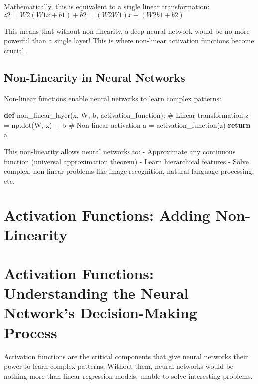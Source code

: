 \documentclass[
  letterpaper,
  DIV=11,
  numbers=noendperiod]{scrreprt}
\newenvironment{Shaded}{\begin{snugshade}}{\end{snugshade}}
\newcommand{\CommentTok}[1]{\textcolor[rgb]{0.37,0.37,0.37}{#1}}
\newcommand{\ControlFlowTok}[1]{\textcolor[rgb]{0.00,0.23,0.31}{\textbf{#1}}}
\newcommand{\KeywordTok}[1]{\textcolor[rgb]{0.00,0.23,0.31}{\textbf{#1}}}
\newcommand{\NormalTok}[1]{\textcolor[rgb]{0.00,0.23,0.31}{#1}}
\newcommand{\OperatorTok}[1]{\textcolor[rgb]{0.37,0.37,0.37}{#1}}
\begin{document}
Mathematically, this is equivalent to a single linear transformation:
\(z2 = W2(W1x + b1) + b2 = (W2W1)x + (W2b1 + b2)\)

This means that without non-linearity, a deep neural network would be no
more powerful than a single layer! This is where non-linear activation
functions become crucial.

\subsection{Non-Linearity in Neural
Networks}\label{non-linearity-in-neural-networks}

Non-linear functions enable neural networks to learn complex patterns:

\begin{Shaded}
\begin{Highlighting}[]
\KeywordTok{def}\NormalTok{ non\_linear\_layer(x, W, b, activation\_function):}
    \CommentTok{\# Linear transformation}
\NormalTok{    z }\OperatorTok{=}\NormalTok{ np.dot(W, x) }\OperatorTok{+}\NormalTok{ b}
    \CommentTok{\# Non{-}linear activation}
\NormalTok{    a }\OperatorTok{=}\NormalTok{ activation\_function(z)}
    \ControlFlowTok{return}\NormalTok{ a}
\end{Highlighting}
\end{Shaded}

This non-linearity allows neural networks to: - Approximate any
continuous function (universal approximation theorem) - Learn
hierarchical features - Solve complex, non-linear problems like image
recognition, natural language processing, etc.

\section{Activation Functions: Adding
Non-Linearity}\label{activation-functions-adding-non-linearity}

\section{Activation Functions: Understanding the Neural Network's
Decision-Making
Process}\label{activation-functions-understanding-the-neural-networks-decision-making-process}

Activation functions are the critical components that give neural
networks their power to learn complex patterns. Without them, neural
networks would be nothing more than linear regression models, unable to
solve interesting problems.
\end{document}
